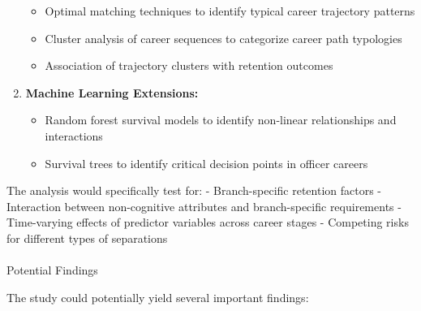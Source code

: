 \documentclass[
  letterpaper,
  DIV=11,
  numbers=noendperiod]{scrartcl}
\makeatletter
\let\oldparagraph\paragraph
\renewcommand{\paragraph}{
    \@ifstar
      \xxxParagraphStar
      \xxxParagraphNoStar
  }
\newcommand{\xxxParagraphStar}[1]{\oldparagraph*{#1}\mbox{}}
\newcommand{\xxxParagraphNoStar}[1]{\oldparagraph{#1}\mbox{}}
\providecommand{\tightlist}{%
  \setlength{\itemsep}{0pt}\setlength{\parskip}{0pt}}
\makeatother
\begin{document}
\begin{enumerate}
  \begin{itemize}
  \tightlist
  \item
    Optimal matching techniques to identify typical career trajectory
    patterns
  \item
    Cluster analysis of career sequences to categorize career path
    typologies
  \item
    Association of trajectory clusters with retention outcomes
  \end{itemize}
\item
  \textbf{Machine Learning Extensions:}

  \begin{itemize}
  \tightlist
  \item
    Random forest survival models to identify non-linear relationships
    and interactions
  \item
    Survival trees to identify critical decision points in officer
    careers
  \end{itemize}
\end{enumerate}

The analysis would specifically test for: - Branch-specific retention
factors - Interaction between non-cognitive attributes and
branch-specific requirements - Time-varying effects of predictor
variables across career stages - Competing risks for different types of
separations

\paragraph{Potential Findings}\label{potential-findings}

The study could potentially yield several important findings:
\end{document}
